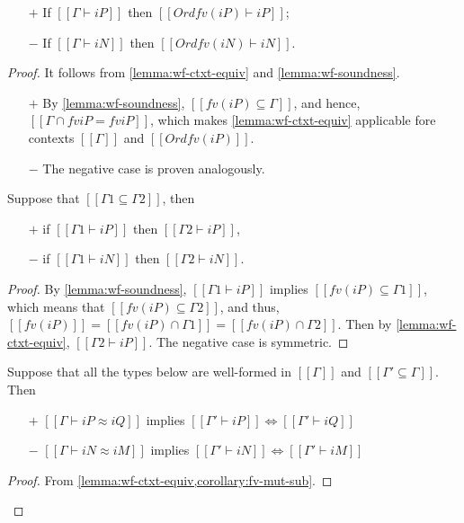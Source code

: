 \begin{corollary}
  \label{corollary:wf-ctxt-strengthening}
  \hfill
  
  \begin{itemize}
    \item [$+$] If $[[Γ ⊢ iP]]$ then $[[Ord fv(iP) ⊢ iP]]$;
    \item [$-$] If $[[Γ ⊢ iN]]$ then $[[Ord fv(iN) ⊢ iN]]$.
  \end{itemize}
\end{corollary}
\begin{proof}
  It follows from \cref{lemma:wf-ctxt-equiv} and \cref{lemma:wf-soundness}.
  \begin{itemize}
    \item [$+$] 
      By \cref{lemma:wf-soundness}, $[[fv(iP) ⊆ {Γ}]]$, and hence,
      $[[{Γ} ∩ fv iP = fv iP ]]$, which makes \cref{lemma:wf-ctxt-equiv}
      applicable fore contexts $[[Γ]]$ and $[[Ord fv(iP)]]$.
    \item[$-$] The negative case is proven analogously.
  \end{itemize}

\begin{corollary}
  \label{lemma:wf-weakening}
  Suppose that $[[{Γ1} ⊆ {Γ2}]]$, then
  \begin{itemize}
    \item[$+$] if $[[Γ1 ⊢ iP]]$ then $[[Γ2 ⊢ iP]]$,
    \item[$-$] if $[[Γ1 ⊢ iN]]$ then $[[Γ2 ⊢ iN]]$.
  \end{itemize}
\end{corollary}
\begin{proof}
  By \cref{lemma:wf-soundness},
  $[[Γ1 ⊢ iP]]$ implies $[[fv(iP) ⊆ {Γ1}]]$,
  which means that $[[fv(iP) ⊆ {Γ2}]]$,
  and thus, $[[fv(iP)]] = [[fv(iP) ∩ {Γ1}]] = [[fv(iP) ∩ {Γ2}]]$.
  Then by \cref{lemma:wf-ctxt-equiv}, $[[Γ2 ⊢ iP]]$. 
  The negative case is symmetric.
\end{proof}


\begin{corollary}
  \label{lemma:mut-sub-types-wf-equiv}
  Suppose that all the types below are well-formed in $[[Γ]]$ and
  $[[{Γ'} ⊆ {Γ}]]$. Then
  \begin{itemize}
  \item[$+$] $[[Γ ⊢ iP ≈ iQ]]$ implies $[[Γ' ⊢ iP]] \iff [[Γ' ⊢ iQ]]$
  \item[$-$] $[[Γ ⊢ iN ≈ iM]]$ implies $[[Γ' ⊢ iN]] \iff [[Γ' ⊢ iM]]$
  \end{itemize}
\end{corollary}
\begin{proof}
  From \cref{lemma:wf-ctxt-equiv,corollary:fv-mut-sub}.
\end{proof}



\end{proof}
